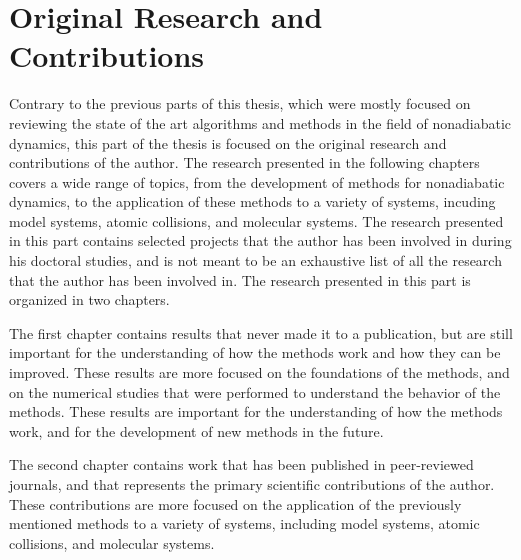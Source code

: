 \part{Original Research and Contributions}
Contrary to the previous parts of this thesis, which were mostly focused on reviewing the state of the art algorithms and methods in the field of nonadiabatic dynamics, this part of the thesis is focused on the original research and contributions of the author. The research presented in the following chapters covers a wide range of topics, from the development of methods for nonadiabatic dynamics, to the application of these methods to a variety of systems, incuding model systems, atomic collisions, and molecular systems. The research presented in this part contains selected projects that the author has been involved in during his doctoral studies, and is not meant to be an exhaustive list of all the research that the author has been involved in. The research presented in this part is organized in two chapters.

The first chapter contains results that never made it to a publication, but are still important for the understanding of how the methods work and how they can be improved. These results are more focused on the foundations of the methods, and on the numerical studies that were performed to understand the behavior of the methods. These results are important for the understanding of how the methods work, and for the development of new methods in the future.

The second chapter contains work that has been published in peer-reviewed journals, and that represents the primary scientific contributions of the author. These contributions are more focused on the application of the previously mentioned methods to a variety of systems, including model systems, atomic collisions, and molecular systems.


